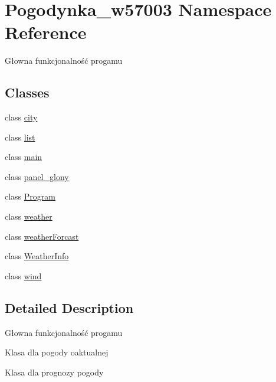 \hypertarget{namespace_pogodynka__w57003}{}\section{Pogodynka\+\_\+w57003 Namespace Reference}
\label{namespace_pogodynka__w57003}


Głowna funkcjonalność progamu  


\subsection*{Classes}
\begin{DoxyCompactItemize}
\item 
class \mbox{\hyperlink{class_pogodynka__w57003_1_1city}{city}}
\item 
class \mbox{\hyperlink{class_pogodynka__w57003_1_1list}{list}}
\item 
class \mbox{\hyperlink{class_pogodynka__w57003_1_1main}{main}}
\item 
class \mbox{\hyperlink{class_pogodynka__w57003_1_1panel__glony}{panel\+\_\+glony}}
\item 
class \mbox{\hyperlink{class_pogodynka__w57003_1_1_program}{Program}}
\item 
class \mbox{\hyperlink{class_pogodynka__w57003_1_1weather}{weather}}
\item 
class \mbox{\hyperlink{class_pogodynka__w57003_1_1weather_forcast}{weather\+Forcast}}
\item 
class \mbox{\hyperlink{class_pogodynka__w57003_1_1_weather_info}{Weather\+Info}}
\item 
class \mbox{\hyperlink{class_pogodynka__w57003_1_1wind}{wind}}
\end{DoxyCompactItemize}


\subsection{Detailed Description}
Głowna funkcjonalność progamu 

Klasa dla pogody oaktualnej 

Klasa dla prognozy pogody 